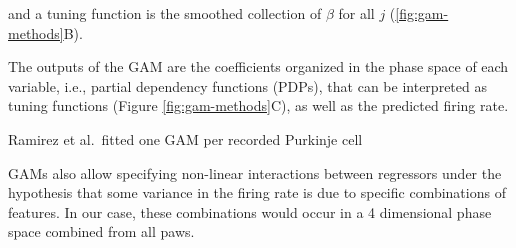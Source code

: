and a tuning function is the smoothed collection of \(\beta\) for all \(j\) (\ref{fig:gam-methods}B).

The outputs of the GAM are the coefficients organized in the phase space of each variable, i.e., partial dependency functions (PDPs), that can be interpreted as tuning functions (Figure \ref{fig:gam-methods}C), as well as the predicted firing rate.





Ramirez et al.~fitted one GAM per recorded Purkinje cell


GAMs also allow specifying non-linear interactions between regressors under the hypothesis that some variance in the firing rate is due to specific combinations of features. In our case, these combinations would occur in a 4 dimensional phase space combined from all paws.
\par 





